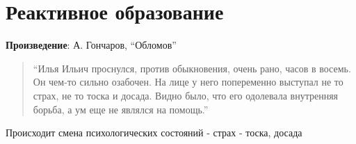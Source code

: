 \section{Реактивное образование}

\textbf{Произведение}: А. Гончаров, “Обломов”

\begin{quote}
    “Илья Ильич проснулся, против обыкновения, очень рано, часов в восемь. Он чем-то сильно озабочен. На лице у него попеременно выступал не то страх, не то тоска и досада. Видно было, что его одолевала внутренняя борьба, а ум еще не являлся на помощь.”
\end{quote}

Происходит смена психологических состояний - страх - тоска, досада 
